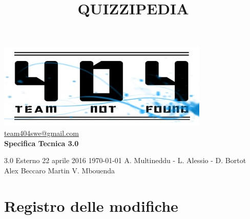 \documentclass[a4paper,11pt]{article}
\title{\textbf{{\fontsize{8mm}{5mm}\selectfont QUIZZIPEDIA}}}
\date{}
\author{}
\begin{document}
	\maketitle
	\thispagestyle{empty}
	\begin{center}	
	\includegraphics{../team_not_found.jpg}\\
	\fontsize{5mm}{3mm}\url{team404swe@gmail.com}\\
	
	\vspace{50mm}
	\textbf{Specifica Tecnica 3.0}
	\end{center}
			{3.0} 							%
			{Esterno} 						%
			{22 aprile 2016} 				%
			{\today} 						%
			{A. Multineddu - L. Alessio - D. Bortot}	%
			{Alex Beccaro } 				%
			{Martin V. Mbouenda} 			%
	\newpage
	\thispagestyle{empty}
	\null  

	\newpage
	\newpage
	\fancyfoot[R]{\thepage}
	
	\hspace{30 mm}
	\section*{Registro delle modifiche}
	
	\beginregistro
	
\end{document}
